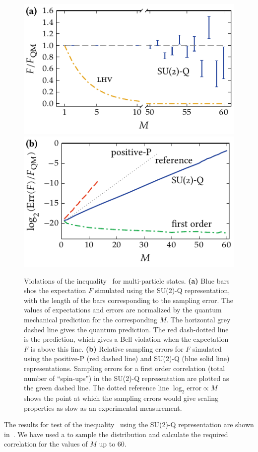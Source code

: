 \begin{figure}
    \centerline{%
    \includegraphics{figures_generated/bell/ghz_violations.pdf}%
    \includegraphics{figures_generated/bell/ghz_errors.pdf}}

    \caption{
    Violations of the inequality~ for multi-particle  states.
    \textbf{(a)} Blue bars shos the expectation $F$ simulated using the SU(2)-Q representation, with the length of the bars corresponding to the sampling error.
    The values of expectations and errors are normalized by the quantum mechanical prediction for the corresponding $M$.
    The horizontal grey dashed line gives the quantum prediction.
    The red dash-dotted line is the  prediction, which gives a Bell violation when the expectation $F$ is above this line.
    \textbf{(b)} Relative sampling errors for $F$ simulated using the positive-P (red dashed line) and SU(2)-Q (blue solid line) representations.
    Sampling errors for a first order correlation (total number of ``spin-ups'') in the SU(2)-Q representation are plotted as the green dashed line.
    The dotted reference line $\log_2 \mathrm{error} \propto M$ shows the point at which the sampling errors would give scaling properties as slow as an experimental measurement.}%

    \label{fig:bell-ineq:ghz:violation}
\end{figure}

The results for test of the inequality~ using the SU(2)-Q representation are shown in~.
We have used a  to sample the distribution and calculate the required correlation for the values of $M$ up to $60$.
